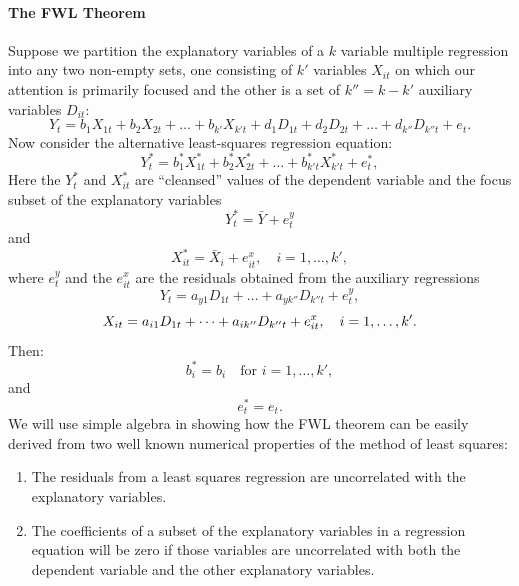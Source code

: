 \documentclass[a4paper, 10pt]{article}
\theoremstyle{definition}	%
\begin{document}
\paragraph{The FWL Theorem}
Suppose we partition the explanatory variables of a $k$ variable multiple regression into any two non-empty sets, one consisting of $k'$ variables $X_{it}$ on which our attention is primarily focused and the other is a set of $k'' = k - k'$ auxiliary variables $D_{it}$:
\begin{equation}
Y_t = b_1 X_{1t} + b_2 X_{2t} + \dots + b_{k'} X_{k't} + d_1 D_{1t} + d_2 D_{2t} + \dots + d_{k''} D_{k''t} + e_t. \label{FWL:7}
\end{equation}
Now consider the alternative least-squares regression equation:
\begin{equation}
Y_t^* = b_1^* X_{1t}^* + b_2^* X_{2t}^* + \dots + b_{k't}^* X_{k't}^* + e_t^*, \label{FWL:8}
\end{equation}
Here the $Y_t^*$ and $X_{it}^*$ are “cleansed” values of the dependent variable and the focus subset of the explanatory variables
\begin{equation}
Y_t^* = \bar{Y} + e_t^y \label{FWL:9}
\end{equation}
and
\begin{equation}
X_{it}^* = \bar{X}_i + e_{it}^x, \quad i = 1, \dots, k',
\end{equation}
where $e_t^y$ and the $e_{it}^x$ are the residuals obtained from the auxiliary regressions
\begin{equation}
Y_t = a_{y1} D_{1t} + \dots + a_{yk''} D_{k''t} + e_t^y, \label{FWL:10}
\end{equation}
\begin{equation}
X_{it} = a_{i1} D_{1t} + \dots + a_{ik''} D_{k''t} + e_{it}^x, \quad i = 1, \dots, k'. \notag
\end{equation}
Then:
\begin{equation}
b_i^* = b_i \quad \text{for } i = 1, \dots, k',
\end{equation}
and
\begin{equation}
e_t^* = e_t.
\end{equation}
We will use simple algebra in showing how the FWL theorem can be easily derived
from two well known numerical properties of the method of least squares:
\begin{enumerate}
    \item The residuals from a least squares regression are uncorrelated with the explanatory variables.
    \item The coefficients of a subset of the explanatory variables in a regression equation will be zero if those variables are uncorrelated with both the dependent variable and the other explanatory variables.
\end{enumerate}
\end{document}

